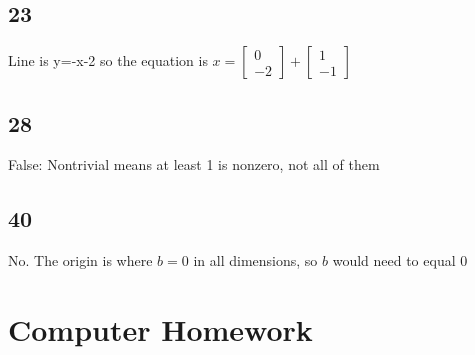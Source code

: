 \documentclass{article}
\begin{document}
\subsection*{23}
Line is y=-x-2
so the equation is $x=\begin{bmatrix}0\\-2\end{bmatrix} + \begin{bmatrix}1 \\ -1\end{bmatrix}$
\subsection*{28}
False: Nontrivial means at least 1 is nonzero, not all of them
\subsection*{40}
No. The origin is where $b=0$ in all dimensions, so $b$ would need to equal 0

\section{Computer Homework}
\subsection{}
\subsection{}
\subsection{}
\subsection{}
\subsection{}
\subsection{}
\subsection{}
\subsection{}
\subsection{}
\subsection{}
\end{document}
